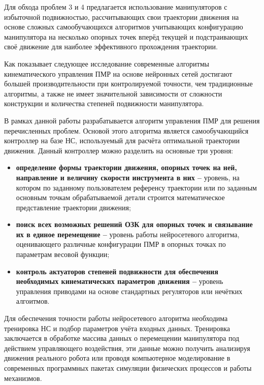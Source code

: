 Для обхода проблем 3 и 4 предлагается использование манипуляторов с избыточной подвижностью, рассчитывающих свои траектории движения на основе сложных самообучающихся алгоритмов учитывающих конфигурацию манипулятора на несколько опорных точек вперёд текущей и подстраивающих своё движение для наиболее эффективного прохождения траектории.

Как показывает следующее исследование \cite{NW_Kinematics} современные алгоритмы кинематического управления ПМР на основе нейронных сетей достигают большей производительности при контролируемой точности, чем традиционные алгоритмы, а также  не имеет значительной зависимости от сложности конструкции и количества степеней подвижности манипулятора.

\newpage
В рамках данной работы разрабатывается алгоритм управления ПМР для решения перечисленных проблем. Основой этого алгоритма является самообучающийся контроллер на базе НС, используемый для расчёта оптимальной траектории движения. Данный контроллер можно разделить на основные три уровня:
\begin{itemize}
    \item \textbf{определение формы траектории движения, опорных точек на ней, направление и величину скорости инструмента в них --} уровень, на котором по заданному пользователем референсу траектории или по заданным основным точкам обрабатываемой детали строится математическое представление траектории движения;
    \item \textbf{поиск всех возможных решений ОЗК для опорных точек и связывание их в единое перемещение --} уровень работы нейросетевого алгоритма, оценивающего различные конфигурации ПМР в опорных точках по параметрам весовой функции;
    \item \textbf{контроль актуаторов степеней подвижности для обеспечения необходимых кинематических параметров движения --} уровень управления приводами на основе стандартных регуляторов или нечётких алгоитмов.
\end{itemize}

Для обеспечения точности работы нейросетевого алгоритма необходима тренировка НС и подбор параметров учёта входных данных. Тренировка заключается в обработке массива данных о перемещении манипулятора под действием управляющего воздействия, эти данные можно получить анализируя движения реального робота или проводя компьютерное моделирование в современных программных пакетах симуляции физических процессов и работы механизмов.

~

